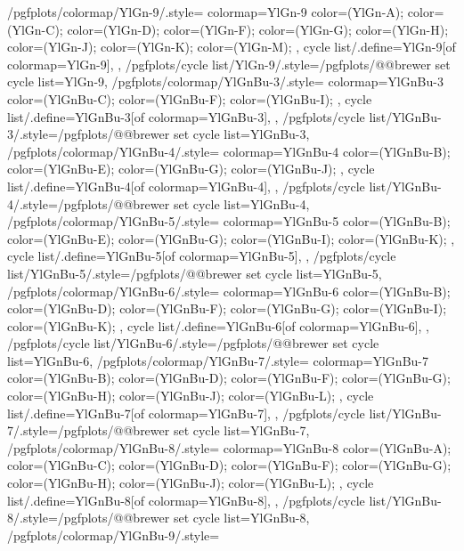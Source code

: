{  %
  /pgfplots/colormap/YlGn-9/.style={
    colormap={YlGn-9}{
      color=(YlGn-A);
      color=(YlGn-C);
      color=(YlGn-D);
      color=(YlGn-F);
      color=(YlGn-G);
      color=(YlGn-H);
      color=(YlGn-J);
      color=(YlGn-K);
      color=(YlGn-M);
    },
    cycle list/.define={YlGn-9}{[of colormap=YlGn-9]},
  },
  /pgfplots/cycle list/YlGn-9/.style={/pgfplots/@@brewer set cycle list={YlGn-9}},
  /pgfplots/colormap/YlGnBu-3/.style={
    colormap={YlGnBu-3}{
      color=(YlGnBu-C);
      color=(YlGnBu-F);
      color=(YlGnBu-I);
    },
    cycle list/.define={YlGnBu-3}{[of colormap=YlGnBu-3]},
  },
  /pgfplots/cycle list/YlGnBu-3/.style={/pgfplots/@@brewer set cycle list={YlGnBu-3}},
  /pgfplots/colormap/YlGnBu-4/.style={
    colormap={YlGnBu-4}{
      color=(YlGnBu-B);
      color=(YlGnBu-E);
      color=(YlGnBu-G);
      color=(YlGnBu-J);
    },
    cycle list/.define={YlGnBu-4}{[of colormap=YlGnBu-4]},
  },
  /pgfplots/cycle list/YlGnBu-4/.style={/pgfplots/@@brewer set cycle list={YlGnBu-4}},
  /pgfplots/colormap/YlGnBu-5/.style={
    colormap={YlGnBu-5}{
      color=(YlGnBu-B);
      color=(YlGnBu-E);
      color=(YlGnBu-G);
      color=(YlGnBu-I);
      color=(YlGnBu-K);
    },
    cycle list/.define={YlGnBu-5}{[of colormap=YlGnBu-5]},
  },
  /pgfplots/cycle list/YlGnBu-5/.style={/pgfplots/@@brewer set cycle list={YlGnBu-5}},
  /pgfplots/colormap/YlGnBu-6/.style={
    colormap={YlGnBu-6}{
      color=(YlGnBu-B);
      color=(YlGnBu-D);
      color=(YlGnBu-F);
      color=(YlGnBu-G);
      color=(YlGnBu-I);
      color=(YlGnBu-K);
    },
    cycle list/.define={YlGnBu-6}{[of colormap=YlGnBu-6]},
  },
  /pgfplots/cycle list/YlGnBu-6/.style={/pgfplots/@@brewer set cycle list={YlGnBu-6}},
  /pgfplots/colormap/YlGnBu-7/.style={
    colormap={YlGnBu-7}{
      color=(YlGnBu-B);
      color=(YlGnBu-D);
      color=(YlGnBu-F);
      color=(YlGnBu-G);
      color=(YlGnBu-H);
      color=(YlGnBu-J);
      color=(YlGnBu-L);
    },
    cycle list/.define={YlGnBu-7}{[of colormap=YlGnBu-7]},
  },
  /pgfplots/cycle list/YlGnBu-7/.style={/pgfplots/@@brewer set cycle list={YlGnBu-7}},
  /pgfplots/colormap/YlGnBu-8/.style={
    colormap={YlGnBu-8}{
      color=(YlGnBu-A);
      color=(YlGnBu-C);
      color=(YlGnBu-D);
      color=(YlGnBu-F);
      color=(YlGnBu-G);
      color=(YlGnBu-H);
      color=(YlGnBu-J);
      color=(YlGnBu-L);
    },
    cycle list/.define={YlGnBu-8}{[of colormap=YlGnBu-8]},
  },
  /pgfplots/cycle list/YlGnBu-8/.style={/pgfplots/@@brewer set cycle list={YlGnBu-8}},
  /pgfplots/colormap/YlGnBu-9/.style={
}}
